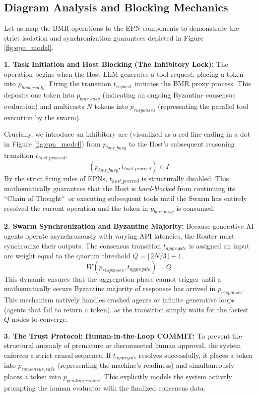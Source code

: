 \documentclass[a4paper,11pt,twocolumn]{article}
\theoremstyle{definition}
\theoremstyle{plain}
\begin{document}
\subsection{Diagram Analysis and Blocking Mechanics}
Let us map the BMR operations to the EPN components to demonstrate the strict isolation and synchronization guarantees depicted in Figure \ref{fig:epn_model}.

\textbf{1. Task Initiation and Host Blocking (The Inhibitory Lock):}
The operation begins when the Host LLM generates a tool request, placing a token into $p_{host\_ready}$. Firing the transition $t_{request}$ initiates the BMR proxy process. This deposits one token into $p_{bmr\_busy}$ (indicating an ongoing Byzantine consensus evaluation) and multicasts $N$ tokens into $p_{responses}$ (representing the parallel tool execution by the swarm). 

Crucially, we introduce an inhibitory arc (visualized as a red line ending in a dot in Figure \ref{fig:epn_model}) from $p_{bmr\_busy}$ to the Host's subsequent reasoning transition $t_{host\_proceed}$. 
$$ (p_{bmr\_busy}, t_{host\_proceed}) \in I $$
By the strict firing rules of EPNs, $t_{host\_proceed}$ is structurally disabled. This mathematically guarantees that the Host is \textit{hard-blocked} from continuing its “Chain of Thought“\ or executing subsequent tools until the Swarm has entirely resolved the current operation and the token in $p_{bmr\_busy}$ is consumed.

\textbf{2. Swarm Synchronization and Byzantine Majority:}
Because generative AI agents operate asynchronously with varying API latencies, the Router must synchronize their outputs. The consensus transition $t_{aggregate}$ is assigned an input arc weight equal to the quorum threshold $Q = \lfloor 2N/3 \rfloor + 1$. 
$$ W(p_{responses}, t_{aggregate}) = Q $$
This dynamic ensures that the aggregation phase cannot trigger until a mathematically secure Byzantine majority of responses has arrived in $p_{responses}$. This mechanism natively handles crashed agents or infinite generative loops (agents that fail to return a token), as the transition simply waits for the fastest $Q$ nodes to converge.

\textbf{3. The Trust Protocol: Human-in-the-Loop COMMIT:}
To prevent the structural anomaly of premature or disconnected human approval, the system enforces a strict causal sequence. If $t_{aggregate}$ resolves successfully, it places a token into $p_{consensus\_safe}$ (representing the machine's readiness) and simultaneously places a token into $p_{pending\_review}$. This explicitly models the system actively prompting the human evaluator with the finalized consensus data.
\end{document}
